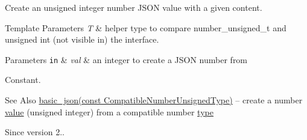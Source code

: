 Create an unsigned integer number J\-S\-O\-N value with a given content.


\begin{DoxyTemplParams}{Template Parameters}
{\em T} & helper type to compare number\-\_\-unsigned\-\_\-t and unsigned int (not visible in) the interface.\\
\hline
\end{DoxyTemplParams}

\begin{DoxyParams}[1]{Parameters}
\mbox{\tt in}  & {\em val} & an integer to create a J\-S\-O\-N number from\\
\hline
\end{DoxyParams}
Constant.

\begin{DoxySeeAlso}{See Also}
\hyperlink{classnlohmann_1_1basic__json_a68a5f34b164a07b8ced13fcf2b7ec834}{basic\-\_\-json(const Compatible\-Number\-Unsigned\-Type)} -- create a number \hyperlink{classnlohmann_1_1basic__json_a0a2cbbd95862a623e7dc5c37e67dead0}{value} (unsigned integer) from a compatible number \hyperlink{classnlohmann_1_1basic__json_a5d466b240d0ba9f648d7fd4ff42359f5}{type}
\end{DoxySeeAlso}
\begin{DoxySince}{Since}
version 2.. 
\end{DoxySince}
